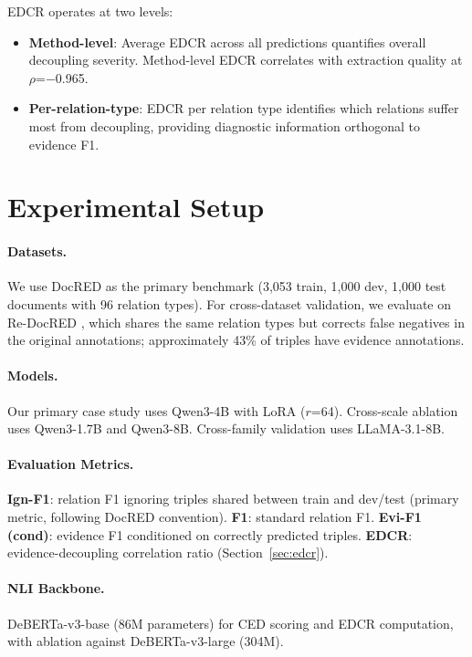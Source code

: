 \documentclass[11pt,a4paper]{article}
\newcommand{\edcr}{EDCR}
\newcommand{\ced}{CED}
\begin{document}
\edcr{} operates at two levels:
\begin{itemize}
    \item \textbf{Method-level}: Average \edcr{} across all predictions quantifies overall decoupling severity. Method-level \edcr{} correlates with extraction quality at $\rho$=$-$0.965.
    \item \textbf{Per-relation-type}: \edcr{} per relation type identifies which relations suffer most from decoupling, providing diagnostic information orthogonal to evidence F1.
\end{itemize}

\section{Experimental Setup}
\label{sec:setup}

\paragraph{Datasets.}
We use DocRED \cite{yao2019docred} as the primary benchmark (3,053 train, 1,000 dev, 1,000 test documents with 96 relation types).
For cross-dataset validation, we evaluate on Re-DocRED \cite{tan2022revisiting}, which shares the same relation types but corrects false negatives in the original annotations; approximately 43\% of triples have evidence annotations.

\paragraph{Models.}
Our primary case study uses Qwen3-4B with LoRA ($r$=64).
Cross-scale ablation uses Qwen3-1.7B and Qwen3-8B.
Cross-family validation uses LLaMA-3.1-8B.

\paragraph{Evaluation Metrics.}
\textbf{Ign-F1}: relation F1 ignoring triples shared between train and dev/test (primary metric, following DocRED convention).
\textbf{F1}: standard relation F1.
\textbf{Evi-F1 (cond)}: evidence F1 conditioned on correctly predicted triples.
\textbf{\edcr{}}: evidence-decoupling correlation ratio (Section~\ref{sec:edcr}).

\paragraph{NLI Backbone.}
DeBERTa-v3-base (86M parameters) for \ced{} scoring and \edcr{} computation, with ablation against DeBERTa-v3-large (304M).
\end{document}
